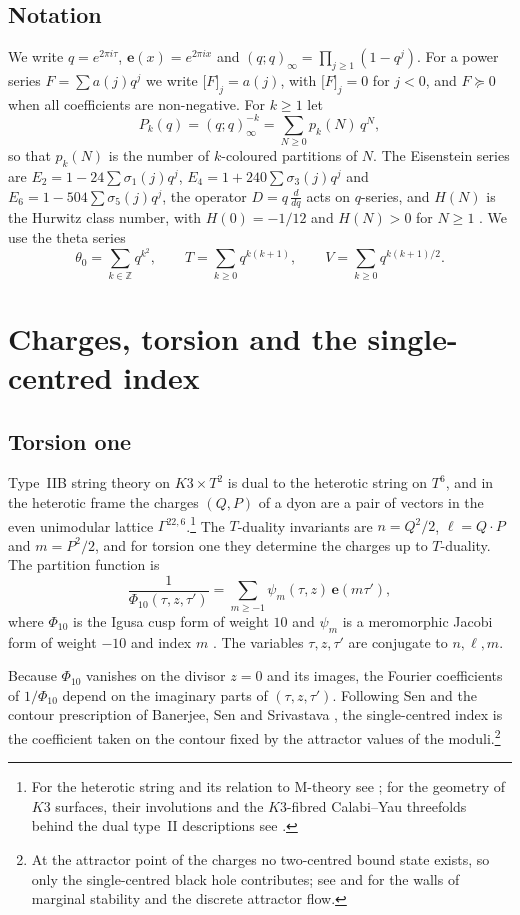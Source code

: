 \documentclass[11pt]{amsart}
\theoremstyle{definition}
\newcommand{\ZZ}{\mathbb{Z}}
\newcommand{\e}{\mathbf e}
\newcommand{\coef}[2]{\big[#1\big]_{#2}}
\begin{document}
\subsection*{Notation}
We write $q=e^{2\pi i\tau}$, $\e(x)=e^{2\pi ix}$ and $(q;q)_\infty=\prod_{j\ge1}(1-q^j)$. For a power series $F=\sum a(j)q^j$ we write $\coef{F}{j}=a(j)$, with $\coef{F}{j}=0$ for $j<0$, and $F\succeq0$ when all coefficients are non-negative. For $k\ge1$ let
\[
P_k(q)=(q;q)_\infty^{-k}=\sum_{N\ge0}p_k(N)\,q^N,
\]
so that $p_k(N)$ is the number of $k$-coloured partitions of $N$. The Eisenstein series are $E_2=1-24\sum\sigma_1(j)q^j$, $E_4=1+240\sum\sigma_3(j)q^j$ and $E_6=1-504\sum\sigma_5(j)q^j$, the operator $D=q\,\frac{d}{dq}$ acts on $q$-series, and $H(N)$ is the Hurwitz class number, with $H(0)=-1/12$ and $H(N)>0$ for $N\ge1$ \cite{HZ76,Zag08}. We use the theta series
\[
\theta_0=\sum_{k\in\ZZ}q^{k^2},\qquad T=\sum_{k\ge0}q^{k(k+1)},\qquad V=\sum_{k\ge0}q^{k(k+1)/2}.
\]

\section{Charges, torsion and the single-centred index}\label{sec:setup}

\subsection{Torsion one}
Type~IIB string theory on $K3\times T^2$ is dual to the heterotic string on $T^6$, and in the heterotic frame the charges $(Q,P)$ of a dyon are a pair of vectors in the even unimodular lattice $\Gamma^{22,6}$.\footnote{For the heterotic string and its relation to M-theory see \cite{SBBT26}; for the geometry of $K3$ surfaces, their involutions and the $K3$-fibred Calabi--Yau threefolds behind the dual type~II descriptions see \cite{BN26,Bha22}.} The $T$-duality invariants are $n=Q^2/2$, $\ell=Q\cdot P$ and $m=P^2/2$, and for torsion one they determine the charges up to $T$-duality. The partition function is
\begin{equation}\label{eq:Phi10}
\frac1{\Phi_{10}(\tau,z,\tau')}=\sum_{m\ge-1}\psi_m(\tau,z)\,\e(m\tau'),
\end{equation}
where $\Phi_{10}$ is the Igusa cusp form of weight $10$ and $\psi_m$ is a meromorphic Jacobi form of weight $-10$ and index $m$ \cite{BM13}. The variables $\tau,z,\tau'$ are conjugate to $n,\ell,m$.

Because $\Phi_{10}$ vanishes on the divisor $z=0$ and its images, the Fourier coefficients of $1/\Phi_{10}$ depend on the imaginary parts of $(\tau,z,\tau')$. Following Sen \cite{Sen07,Sen11} and the contour prescription of Banerjee, Sen and Srivastava \cite{BSS09}, the single-centred index is the coefficient taken on the contour fixed by the attractor values of the moduli.\footnote{At the attractor point of the charges no two-centred bound state exists, so only the single-centred black hole contributes; see \cite{Sen07} and \cite{CV08} for the walls of marginal stability and the discrete attractor flow.}
\end{document}
